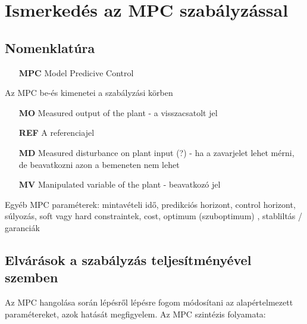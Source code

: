 \section{Ismerkedés az MPC szabályzással}

\subsection*{Nomenklatúra}

\begin{itemize}[noitemsep,topsep=-8pt,parsep=0pt,partopsep=0pt,leftmargin=42pt]
	\item[\textbf{MPC}] Model Predicive Control
\end{itemize}

\vspace{12pt}


\begin{table*}[h]
	\caption{Az MPC be-és kimenetei a szabályzási körben}
	\label{nomencl_mpcsignals}
	\begin{itemize}[noitemsep,topsep=0pt,parsep=2pt,partopsep=4pt,leftmargin=42pt]
		\item[\textbf{MO}] Measured output of the plant - a visszacsatolt jel
		\item[\textbf{REF}] A referenciajel %
		\item[\textbf{MD}] Measured disturbance on plant input (?) - ha a zavarjelet lehet mérni, de beavatkozni azon a bemeneten nem lehet
		\item[\textbf{MV}] Manipulated variable of the plant - beavatkozó jel 
	\end{itemize}
\end{table*}
Egyéb MPC paraméterek: mintavételi idő, predikciós horizont, control horizont, súlyozás, soft vagy hard constraintek, cost, optimum (szuboptimum) , stabliltás / garanciák






\subsection{Elvárások a szabályzás teljesítményével szemben}

Az MPC hangolása során %
lépésről lépésre fogom módosítani az alapértelmezett paramétereket, azok hatását megfigyelem.
Az MPC szintézis folyamata:%


